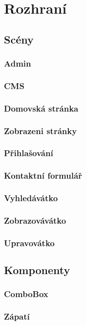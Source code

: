 \section{Rozhraní}
\subsection{Scény}
\subsubsection{Admin}
\subsubsection{CMS}
\subsubsection{Domovská stránka}
\subsubsection{Zobrazeni stránky}
\subsubsection{Přihlašování}
\subsubsection{Kontaktní formulář}
\subsubsection{Vyhledávátko}
\subsubsection{Zobrazovávátko}
\subsubsection{Upravovátko}

\subsection{Komponenty}
\subsubsection{ComboBox}
\subsubsection{Zápatí}
